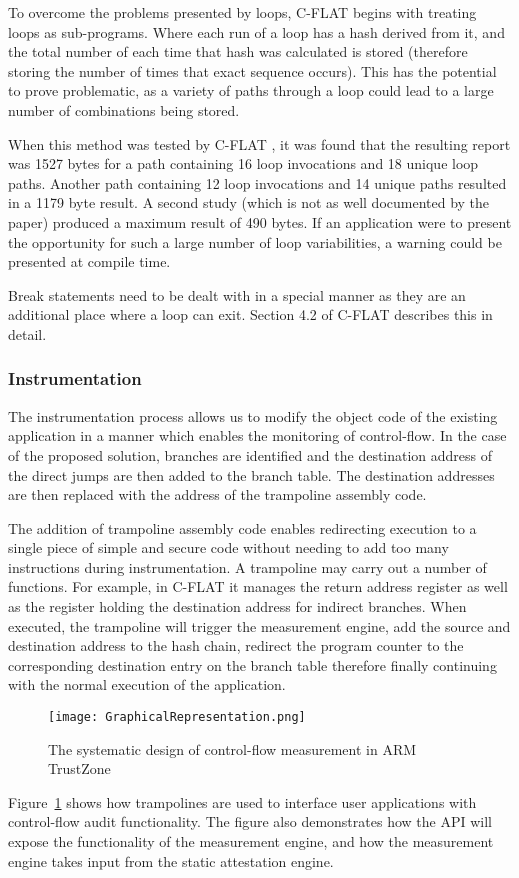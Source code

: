 To overcome the problems presented by loops, C-FLAT \cite{Abera2016} begins with treating loops as sub-programs. Where each run of a loop has a hash derived from it, and the total number of each time that hash was calculated is stored (therefore storing the number of times that exact sequence occurs). This has the potential to prove problematic, as a variety of paths through a loop could lead to a large number of combinations being stored. 

When this method was tested by C-FLAT \cite{Abera2016}, it was found that the resulting report was 1527 bytes for a path containing 16 loop invocations and 18 unique loop paths. Another path containing 12 loop invocations and 14 unique paths resulted in a 1179 byte result. A second study (which is not as well documented by the paper) produced a maximum result of 490 bytes. If an application were to present the opportunity for such a large number of loop variabilities, a warning could be presented at compile time.

Break statements need to be dealt with in a special manner as they are an additional place where a loop can exit. Section 4.2 of C-FLAT \cite{Abera2016} describes this in detail.

\subsubsection*{Instrumentation}

The instrumentation process allows us to modify the object code of the existing application in a manner which enables the monitoring of control-flow. In the case of the proposed solution, branches are identified and the destination address of the direct jumps are then added to the branch table. The destination addresses are then replaced with the address of the trampoline assembly code. 

The addition of trampoline assembly code enables redirecting execution to a single piece of simple and secure code without needing to add too many instructions during instrumentation. A trampoline may carry out a number of functions. For example, in C-FLAT \cite{Abera2016} it manages the return address register as well as the register holding the destination address for indirect branches. When executed, the trampoline will trigger the measurement engine, add the source and destination address to the hash chain, redirect the program counter to the corresponding destination entry on the branch table therefore finally continuing with the normal execution of the application.

\begin{figure}
  \centering
  \vspace*{0.5in}
  \texttt{[image: GraphicalRepresentation.png]}
  \caption{The systematic design of control-flow measurement in ARM TrustZone}
  \label{fig:graphicalRepresentation}
\end{figure}

Figure~\ref{fig:graphicalRepresentation} shows how trampolines are used to interface user applications with control-flow audit functionality. The figure also demonstrates how the API will expose the functionality of the measurement engine, and how the measurement engine takes input from the static attestation engine.
